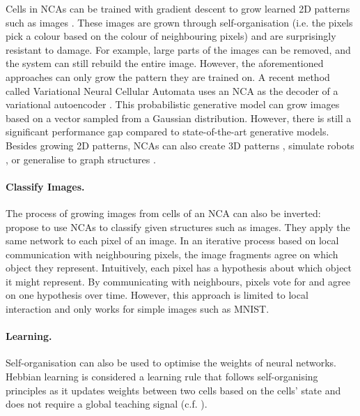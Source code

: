 Cells in NCAs can be trained with gradient descent to grow learned 2D patterns such as images .
These images are grown through self-organisation (i.e. the pixels pick a colour based on the colour of neighbouring pixels) and are surprisingly resistant to damage.
For example, large parts of the images can be removed, and the system can still rebuild the entire image.
However, the aforementioned approaches can only grow the pattern they are trained on.
A recent method called Variational Neural Cellular Automata  uses an NCA as the decoder of a variational autoencoder .
This probabilistic generative model can grow images based on a vector sampled from a Gaussian distribution.
However, there is still a significant performance gap compared to state-of-the-art generative models.
Besides growing 2D patterns, NCAs can also create 3D patterns \cite{sudhakaran_growing_2021}, simulate robots \cite{hu_regenerating_2021}, or generalise to graph structures \cite{grattarola_learning_2021}.

\paragraph{Classify Images.} The process of growing images from cells of an NCA can also be inverted:
 propose to use NCAs to classify given structures such as images.
They apply the same network to each pixel of an image.
In an iterative process based on local communication with neighbouring pixels, the image fragments agree on which object they represent.
Intuitively, each pixel has a hypothesis about which object it might represent. By communicating with neighbours, pixels vote for and agree on one hypothesis over time.
However, this approach is limited to local interaction and only works for simple images such as MNIST.

\paragraph{Learning.} Self-organisation can also be used to optimise the weights of neural networks.
Hebbian learning is considered a learning rule that follows self-organising principles  as it updates weights between two cells based on the cells' state and does not require a global teaching signal (c.f. ).

